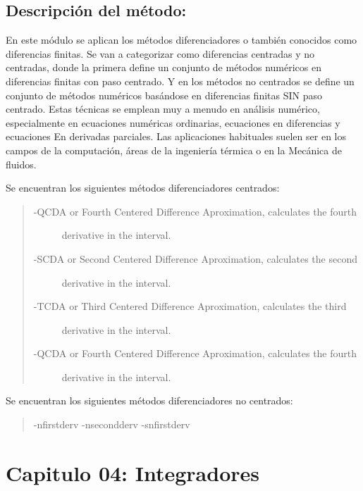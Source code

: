 \documentclass[letterpaper,10pt,oneside]{sphinxmanual}
\theoremstyle{plain}%
\theoremstyle{definition}%
\theoremstyle{remark}%
\begin{document}
\section{Descripción del método:}
\label{chapter03:descripcion-del-metodo}
En este módulo se aplican los métodos diferenciadores o también conocidos como diferencias finitas. Se van a categorizar como diferencias centradas y no centradas, donde la primera define un conjunto de métodos numéricos en diferencias finitas con paso centrado. Y en los métodos no centrados se define un conjunto de métodos numéricos basándose en diferencias finitas SIN paso centrado.
Estas técnicas se emplean muy a menudo en análisis numérico, especialmente en ecuaciones numéricas ordinarias, ecuaciones en diferencias y ecuaciones
En derivadas parciales. Las aplicaciones habituales suelen ser en los campos de la computación, áreas de la ingeniería térmica o en la Mecánica de fluidos.

Se encuentran los siguientes métodos diferenciadores centrados:
\begin{quote}
\begin{description}
\item[{-QCDA or Fourth Centered Difference Aproximation, calculates the fourth}] \leavevmode
derivative in the interval.

\item[{-SCDA or Second Centered Difference Aproximation, calculates the second}] \leavevmode
derivative in the interval.

\item[{-TCDA or Third Centered Difference Aproximation, calculates the third}] \leavevmode
derivative in the interval.

\item[{-QCDA or Fourth Centered Difference Aproximation, calculates the fourth}] \leavevmode
derivative in the interval.

\end{description}
\end{quote}

Se encuentran los siguientes métodos diferenciadores no centrados:
\begin{quote}

-nfirstderv
-nsecondderv
-snfirstderv
\end{quote}


\chapter{Capitulo 04: Integradores}
\label{chapter04::doc}\label{chapter04:capitulo-04-integradores}
\end{document}

